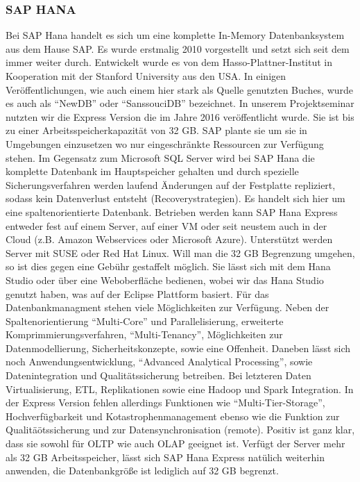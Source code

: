 \documentclass[a4paper, 12pt]{scrartcl}
\begin{document}
\subsubsection{SAP HANA}
Bei SAP Hana handelt es sich um eine komplette In-Memory Datenbanksystem aus dem Hause SAP. Es wurde erstmalig 2010 vorgestellt und setzt sich seit dem immer weiter durch. Entwickelt wurde es von dem Hasso-Plattner-Institut in Kooperation mit der Stanford University aus den USA. In einigen Veröffentlichungen, wie auch einem hier stark als Quelle genutzten Buches, wurde es auch als "`NewDB"' oder "`SanssouciDB"' bezeichnet. In unserem Projektseminar nutzten wir die Express Version die im Jahre 2016 veröffentlicht wurde. Sie ist bis zu einer Arbeitsspeicherkapazität von 32 GB. SAP plante sie um sie in Umgebungen einzusetzen wo nur eingeschränkte Ressourcen zur Verfügung stehen. Im Gegensatz zum Microsoft SQL Server wird bei SAP Hana die komplette Datenbank im Hauptspeicher gehalten und durch spezielle Sicherungsverfahren werden laufend Änderungen auf der Festplatte repliziert, sodass kein Datenverlust entsteht (Recoverystrategien). Es handelt sich hier um eine spaltenorientierte Datenbank. Betrieben werden kann SAP Hana Express entweder fest auf einem Server, auf einer VM oder seit neustem auch in der Cloud (z.B. Amazon Webservices oder Microsoft Azure). Unterstützt werden Server mit SUSE oder Red Hat Linux. Will man die 32 GB Begrenzung umgehen, so ist dies gegen eine Gebühr gestaffelt möglich. Sie lässt sich mit dem Hana Studio oder über eine Weboberfläche bedienen, wobei wir das Hana Studio genutzt haben, was auf der Eclipse Plattform basiert. Für das Datenbankmanagment stehen viele Möglichkeiten zur Verfügung. Neben der Spaltenorientierung "`Multi-Core"' und Parallelisierung, erweiterte Komprimmierungsverfahren, "`Multi-Tenancy"', Möglichkeiten zur Datenmodellierung, Sicherheitskonzepte, sowie eine Offenheit. Daneben lässt sich noch  Anwendungsentwicklung, "`Advanced Analytical Processing"', sowie Datenintegration und Qualitätssicherung betreiben. Bei letzteren Daten Virtualisierung, ETL, Replikationen sowie eine Hadoop und Spark Integration. In der Express Version fehlen allerdings Funktionen wie "`Multi-Tier-Storage"', Hochverfügbarkeit und Kotastrophenmanagement ebenso wie die Funktion zur Qualitäötssicherung und zur Datensynchronisation (remote). Positiv ist ganz klar, dass sie sowohl für OLTP wie auch OLAP geeignet ist. Verfügt der Server mehr als 32 GB Arbeitsspeicher, lässt sich SAP Hana Express natülich weiterhin anwenden, die Datenbankgröße ist lediglich auf 32 GB begrenzt.   
\end{document}
